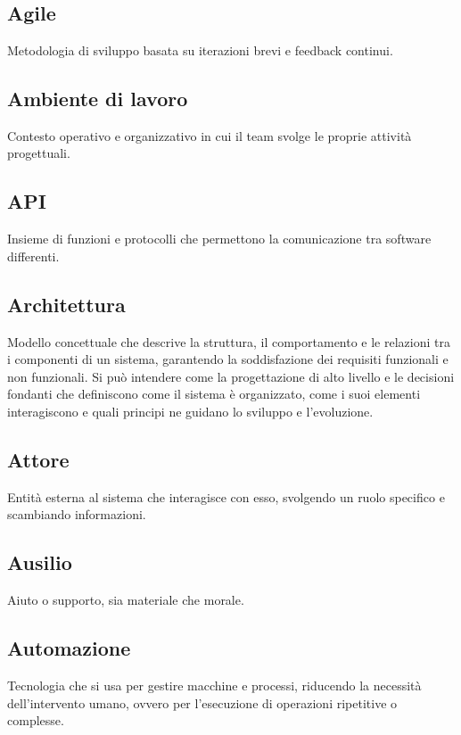 \documentclass[a4paper,12pt]{article}
\begin{document}
    

\renewcommand{\thesection}{\Alph{section}}
\setcounter{section}{0}

\newpage

        \section{}
        
          \subsection*{Agile}
			Metodologia di sviluppo basata su iterazioni brevi e feedback continui.
          \subsection*{Ambiente di lavoro}
			Contesto operativo e organizzativo in cui il team svolge le proprie attività progettuali.
          \subsection*{API}
			Insieme di funzioni e protocolli che permettono la comunicazione tra software differenti.
          \subsection*{Architettura}
			Modello concettuale che descrive la struttura, il comportamento e le relazioni tra i componenti di un sistema, garantendo la soddisfazione dei requisiti funzionali e non funzionali. Si può intendere come la progettazione di alto livello e le decisioni fondanti che definiscono come il sistema è organizzato, come i suoi elementi interagiscono e quali principi ne guidano lo sviluppo e l'evoluzione.
          \subsection*{Attore}
			Entità esterna al sistema che interagisce con esso, svolgendo un ruolo specifico e scambiando informazioni.
          \subsection*{Ausilio}
			Aiuto o supporto, sia materiale che morale.
          \subsection*{Automazione}
			Tecnologia che si usa per gestire macchine e processi, riducendo la necessità dell'intervento umano, ovvero per l'esecuzione di operazioni ripetitive o complesse.
        
\end{document}
